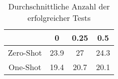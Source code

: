 \bgroup
\def\arraystretch{2}
\begin{table}[H]
	\vspace{.5cm}
	\centering		
	\begin{center}
		\begin{tabular}{|c||c|c|c|}
			\hline 
			& 0 & 0.25 & 0.5 \\
			\hline 
			\hline
			Zero-Shot & 23.9 & 27 & 24.3 \\
			\hline
			One-Shot & 19.4 & 20.7 & 20.1 \\
			\hline
		\end{tabular} 
	\end{center}
	\caption{Durchschnittliche Anzahl der erfolgreicher Tests}
	\label{fig:succ-unit}
	\vspace{-.8cm}
\end{table}
\egroup